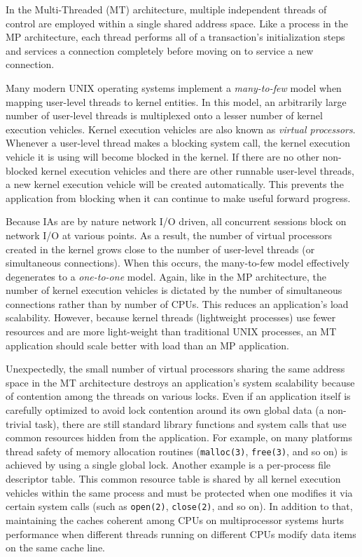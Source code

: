 \documentclass[a4paper,12pt,notitlepage,twoside,openright]{article}
\begin{document}
In the Multi-Threaded (MT) architecture, multiple independent threads of
control are employed within a single shared address space. Like a
process in the MP architecture, each thread performs all of a
transaction's initialization steps and services a connection completely
before moving on to service a new connection.

Many modern UNIX operating systems implement a \emph{many-to-few} model
when mapping user-level threads to kernel entities. In this model, an
arbitrarily large number of user-level threads is multiplexed onto a
lesser number of kernel execution vehicles. Kernel execution vehicles
are also known as \emph{virtual processors}. Whenever a user-level
thread makes a blocking system call, the kernel execution vehicle it is
using will become blocked in the kernel. If there are no other
non-blocked kernel execution vehicles and there are other runnable
user-level threads, a new kernel execution vehicle will be created
automatically. This prevents the application from blocking when it can
continue to make useful forward progress.

Because IAs are by nature network I/O driven, all concurrent sessions
block on network I/O at various points. As a result, the number of
virtual processors created in the kernel grows close to the number of
user-level threads (or simultaneous connections). When this occurs, the
many-to-few model effectively degenerates to a \emph{one-to-one} model.
Again, like in the MP architecture, the number of kernel execution
vehicles is dictated by the number of simultaneous connections rather
than by number of CPUs. This reduces an application's load scalability.
However, because kernel threads (lightweight processes) use fewer
resources and are more light-weight than traditional UNIX processes, an
MT application should scale better with load than an MP application.

Unexpectedly, the small number of virtual processors sharing the same
address space in the MT architecture destroys an application's system
scalability because of contention among the threads on various locks.
Even if an application itself is carefully optimized to avoid lock
contention around its own global data (a non-trivial task), there are
still standard library functions and system calls that use common
resources hidden from the application. For example, on many platforms
thread safety of memory allocation routines (\texttt{malloc(3)},
\texttt{free(3)}, and so on) is achieved by using a single global lock.
Another example is a per-process file descriptor table. This common
resource table is shared by all kernel execution vehicles within the
same process and must be protected when one modifies it via certain
system calls (such as \texttt{open(2)}, \texttt{close(2)}, and so on).
In addition to that, maintaining the caches coherent among CPUs on
multiprocessor systems hurts performance when different threads running
on different CPUs modify data items on the same cache line.
\end{document}
